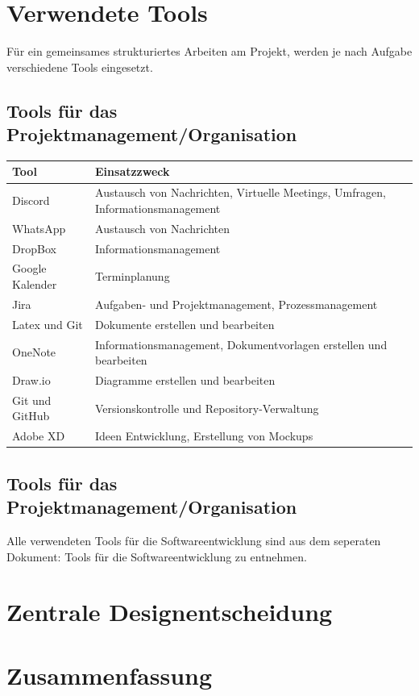 \documentclass[a4paper,11pt]{scrartcl}
\begin{document}
\section{Verwendete Tools}
Für ein gemeinsames strukturiertes Arbeiten am Projekt, werden je nach Aufgabe verschiedene Tools eingesetzt. 
	\subsection{Tools für das Projektmanagement/Organisation}
\begin{table}[H]
\begin{tabular}{|p{4cm}|p{8cm}|}
\hline
\textbf{Tool} &\textbf{Einsatzzweck} \\ \hline
Discord &  Austausch von Nachrichten, Virtuelle Meetings, Umfragen, Informationsmanagement\\ \hline
WhatsApp &  Austausch von Nachrichten\\ \hline
DropBox & Informationsmanagement \\ \hline
Google Kalender & Terminplanung   \\ \hline
Jira &  Aufgaben- und Projektmanagement, Prozessmanagement \\ \hline
Latex und Git &  Dokumente erstellen und bearbeiten \\ \hline
OneNote &  Informationsmanagement, Dokumentvorlagen erstellen und bearbeiten \\ \hline
Draw.io &  Diagramme erstellen und bearbeiten \\ \hline
Git und GitHub & Versionskontrolle und Repository-Verwaltung \\ \hline
Adobe XD & Ideen Entwicklung, Erstellung von Mockups \\ \hline
\end{tabular}
\end{table}
	\subsection{Tools für das Projektmanagement/Organisation}
Alle verwendeten Tools für die Softwareentwicklung sind aus dem seperaten Dokument: \glqq Tools für die Softwareentwicklung\grqq{} zu entnehmen.

\section{Zentrale Designentscheidung}

\section{Zusammenfassung}



\end{document}
